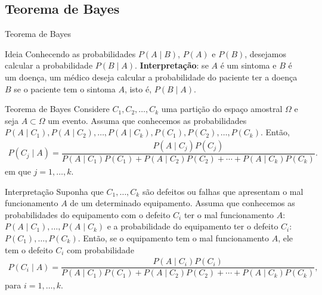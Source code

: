 \documentclass[9pt]{beamer}
\begin{document}
\subsection{Teorema de Bayes}
\begin{frame}{Teorema de Bayes}

{\tiny
	\begin{block}{Ideia}
		Conhecendo as probabilidades $P(A \mid B)$, $P(A)$ e $P(B)$, desejamos calcular a probabilidade $P(B \mid A)$. \textbf{Interpretação}: se $A$ é um sintoma e $B$ é um doença, um médico deseja calcular a probabilidade do paciente ter a doença $B$ se o paciente tem o sintoma $A$, isto é, $P(B \mid A)$.
	\end{block}

	\begin{block}{Teorema de Bayes}
		Considere $C_1, C_2, \dots, C_k$ uma partição do espaço amostral $\Omega$ e seja $A \subset \Omega$ um evento. Assuma que conhecemos as probabilidades $P(A \mid C_1), P(A \mid C_2), \dots, P(A \mid C_k), P(C_1), P(C_2), \dots, P(C_k)$. Então,
		\begin{align*}
		P(C_j \mid A) = \dfrac{P(A \mid C_j)P(C_j)}{P(A \mid C_1)P(C_1)+P(A \mid C_2)P(C_2) + \cdots + P(A \mid C_k)P(C_k)}.
		\end{align*}
		 em que $j =1, \dots, k$.
	\end{block}
	
	\begin{block}{Interpretação}
	 Suponha que $C_1, \dots, C_k$ são defeitos ou falhas que apresentam o mal funcionamento $A$ de um determinado equipamento. 
	 Assuma que  conhecemos as probabilidades do equipamento com o defeito $C_i$ ter o mal funcionamento $A$:$P(A \mid C_1), \dots, P(A \mid C_k)$ 
	 e a probabilidade do equipamento ter o defeito $C_i$: $P(C_1), \dots, P(C_k)$. Então, se o equipamento tem o mal funcionamento $A$, ele tem o defeito $C_i$ com probabilidade
	 \begin{align*}
	  P(C_i \mid A) = \dfrac{P(A \mid C_i)P(C_i)}{P(A \mid C_1)P(C_1)+P(A \mid C_2)P(C_2) + \cdots + P(A \mid C_k)P(C_k)},
	 \end{align*}
	 para $i=1, \dots, k$.
	\end{block}
}
\end{frame}
\end{document}
